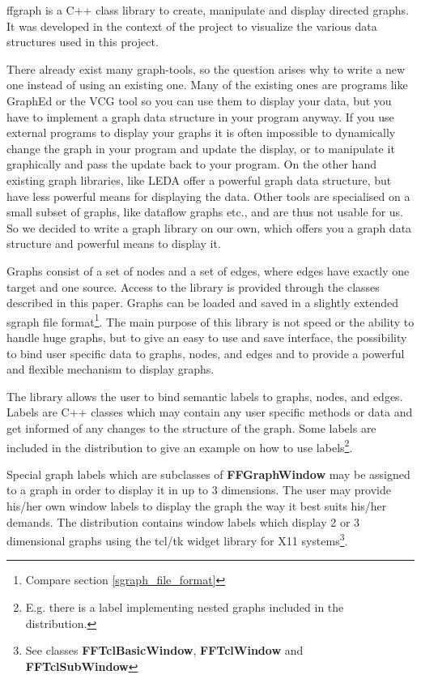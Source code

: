 ffgraph is a C++ class library to create, manipulate and display
directed graphs. It was developed in the context of the
\meta{}\cite{meta:95} project to visualize the various data structures
used in this project.

There already exist many graph-tools, so the question arises why to
write a new one instead of using an existing one. Many of the existing
ones are programs like GraphEd\cite{GraphEd:Himsolt-90b} or the VCG
tool\cite{sander:94} so you can use them to display your data, but you
have to implement a graph data structure in your program anyway. If you
use external programs to display your graphs it is often impossible to
dynamically change the graph in your program and update the display, or
to manipulate it graphically and pass the update back to your
program. On the other hand existing graph libraries, like
LEDA\cite{naeher:94} offer a powerful graph data structure, but have
less powerful means for displaying the data. Other tools are specialised
on a small subset of graphs, like dataflow graphs etc., and are thus not
usable for us. So we decided to write a graph library on our own, which
offers you a graph data structure and powerful means to display it.

Graphs consist of a set of nodes and a set of
edges, where edges have exactly one target and one source. Access
to the library is provided through the classes described in this
paper. Graphs can be loaded and saved in a slightly extended
sgraph\cite{Sgraph:Himsolt-93a} file format\footnote{Compare
  section \vref{sgraph_file_format}}. The main purpose of this
library is not speed or the ability to handle huge graphs, but to
give an easy to use and save interface, the possibility to bind
user specific data to graphs, nodes, and edges and to provide a
powerful and flexible mechanism to display graphs. 

The library allows the user to bind semantic labels to graphs, nodes,
and edges. Labels are C++ classes which may contain any user specific
methods or data and get informed of any changes to the structure of
the graph. Some labels are included in the distribution to give an
example on how to use labels\footnote{E.g. there is a label
implementing nested graphs included in the distribution.}.  

Special graph labels which are subclasses of {\bf FFGraphWindow} may be
assigned to a graph in order to display it in up to 3 dimensions. The
user may provide his/her own window labels to display the graph the way
it best suits his/her demands. The distribution contains window labels
which display 2 or 3 dimensional graphs using the tcl/tk\cite{Tcl:Oust}
widget library for X11 systems\footnote{See classes {\bf
FFTclBasicWindow}, {\bf FFTclWindow} and {\bf FFTclSubWindow}}.

